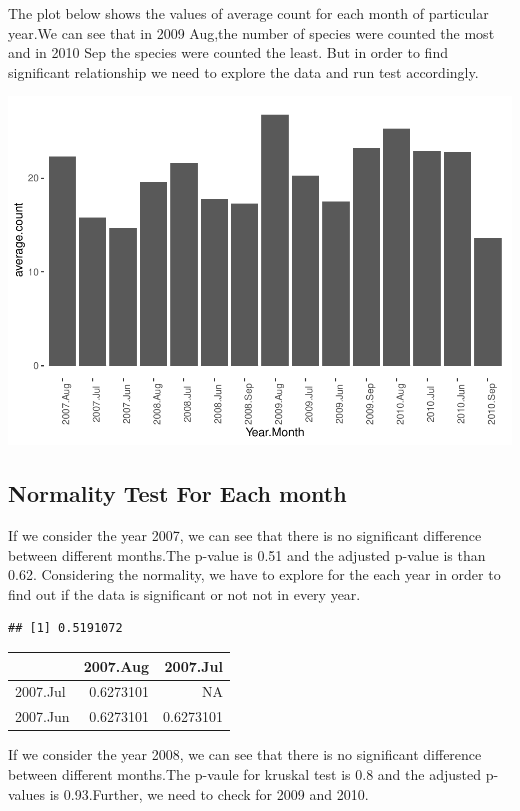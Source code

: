 \documentclass[
]{article}
\begin{document}
The plot below shows the values of average count for each month of
particular year.We can see that in 2009 Aug,the number of species were
counted the most and in 2010 Sep the species were counted the least. But
in order to find significant relationship we need to explore the data
and run test accordingly.

\includegraphics{Statistical-analysis-in-RStudio_files/figure-latex/unnamed-chunk-10-1.pdf}

\hypertarget{normality-test-for-each-month}{%
\subsection{Normality Test For Each
month}\label{normality-test-for-each-month}}

If we consider the year 2007, we can see that there is no significant
difference between different months.The p-value is 0.51 and the adjusted
p-value is than 0.62. Considering the normality, we have to explore for
the each year in order to find out if the data is significant or not not
in every year.

\begin{verbatim}
## [1] 0.5191072
\end{verbatim}

\begin{longtable}[]{@{}lrr@{}}
\toprule
& 2007.Aug & 2007.Jul\tabularnewline
\midrule
\endhead
2007.Jul & 0.6273101 & NA\tabularnewline
2007.Jun & 0.6273101 & 0.6273101\tabularnewline
\bottomrule
\end{longtable}

If we consider the year 2008, we can see that there is no significant
difference between different months.The p-vaule for kruskal test is 0.8
and the adjusted p-values is 0.93.Further, we need to check for 2009 and
2010.
\end{document}
